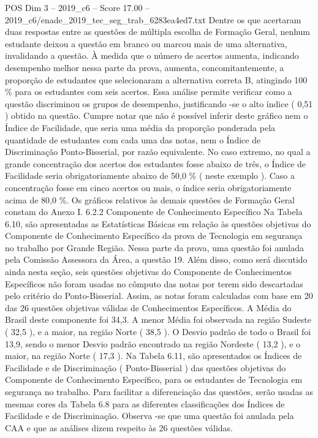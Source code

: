 \begin{textsample}{POS Dim 3 – 2019\_c6 – Score 17.00 – 2019\_c6/enade\_2019\_tec\_seg\_trab\_6283ea4ed7.txt}
Dentre os que acertaram duas respostas entre as questões de múltipla escolha de Formação Geral, nenhum estudante deixou a questão em branco ou marcou mais de uma alternativa, invalidando a questão.
À medida que o número de acertos aumenta, indicando desempenho melhor nessa parte da prova, aumenta, concomitantemente, a proporção de estudantes que selecionaram a alternativa correta B, atingindo 100 \% para os estudantes com seis acertos.
Essa análise permite verificar como a questão discriminou os grupos de desempenho, justificando -se o alto índice ( 0,51 ) obtido na questão.
Cumpre notar que não é possível inferir deste gráfico nem o Índice de Facilidade, que seria uma média da proporção ponderada pela quantidade de estudantes com cada uma das notas, nem o Índice de Discriminação Ponto-Bisserial, por razão equivalente.
No caso extremo, no qual a grande concentração dos acertos dos estudantes fosse abaixo de três, o Índice de Facilidade seria obrigatoriamente abaixo de 50,0 \% ( neste exemplo ).
Caso a concentração fosse em cinco acertos ou mais, o índice seria obrigatoriamente acima de 80,0 \%.
Os gráficos relativos às demais questões de Formação Geral constam do Anexo I. 6.2.2 Componente de Conhecimento Específico Na Tabela 6.10, são apresentadas as Estatísticas Básicas em relação às questões objetivas do Componente de Conhecimento Específico da prova de Tecnologia em segurança no trabalho por Grande Região.
Nessa parte da prova, uma questão foi anulada pela Comissão Assessora da Área, a questão 19.
Além disso, como será discutido ainda nesta seção, seis questões objetivas do Componente de Conhecimentos Específicos não foram usadas no cômputo das notas por terem sido descartadas pelo critério do Ponto-Bisserial.
Assim, as notas foram calculadas com base em 20 das 26 questões objetivas válidas de Conhecimentos Específicos.
A Média do Brasil deste componente foi 34,3.
A menor Média foi observada na região Sudeste ( 32,5 ), e a maior, na região Norte ( 38,5 ).
O Desvio padrão de todo o Brasil foi 13,9, sendo o menor Desvio padrão encontrado na região Nordeste ( 13,2 ), e o maior, na região Norte ( 17,3 ).
Na Tabela 6.11, são apresentados os Índices de Facilidade e de Discriminação ( Ponto-Bisserial ) das questões objetivas do Componente de Conhecimento Específico, para os estudantes de Tecnologia em segurança no trabalho.
Para facilitar a diferenciação das questões, serão usadas as mesmas cores da Tabela 6.8 para as diferentes classificações dos Índices de Facilidade e de Discriminação.
Observa -se que uma questão foi anulada pela CAA e que as análises dizem respeito às 26 questões válidas.

\end{textsample}

